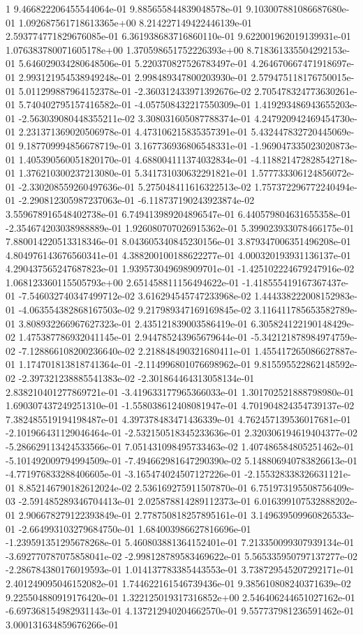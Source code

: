 1	9.466822206455544064e-01	9.885655844839048578e-01	9.103007881086687680e-01	1.092687561718613365e+00	8.214227149422446139e-01	2.593774771829676085e-01	6.361938683716860110e-01	9.622001962019139931e-01	1.076383780071605178e+00	1.370598651752226393e+00	8.718361335504292153e-01	5.646029034280648506e-01	5.220370827526783497e-01	4.264670667471918697e-01	2.993121954538949248e-01	2.998489347800203930e-01	2.579475118176750015e-01	5.011299887964152378e-01	-2.360312433971392676e-02	2.705478324773630261e-01	5.740402795157416582e-01	-4.057508432217550309e-01	1.419293486943655203e-01	-2.563039080448355211e-02	3.308031605087788374e-01	4.247920942469454730e-01	2.231371369020506978e-01	4.473106215835357391e-01	5.432447832720445069e-01	9.187709994856678719e-01	3.167736936806548331e-01	-1.969047335023020873e-01	1.405390560051820170e-01	4.688004111374032834e-01	-4.118821472828542718e-01	1.376210300237213080e-01	5.341731030632291821e-01	1.577733306124856072e-01	-2.330208559260497636e-01	5.275048411616322513e-02	1.757372296772240494e-01	-2.290812305987237063e-01	-6.118737190243923874e-02	3.559678916548402738e-01	6.749413989204896547e-01	6.440579804631655358e-01	-2.354674203038988889e-01	1.926080707026915362e-01	5.399023933078466175e-01	7.880014220513318346e-01	8.043605340845230156e-01	3.879347006351496208e-01	4.804976143676560341e-01	4.388200100188622277e-01	4.000320193931136137e-01	4.290437565247687823e-01	1.939573049698909701e-01	-1.425102224679247916e-02	1.068123360115505793e+00	2.651458811156494622e-01	-1.418555419167367437e-01	-7.546032740347499712e-02	3.616294545747233968e-02	1.444338222008152983e-01	-4.063554382868167503e-02	9.217989347169169845e-02	3.116411785653582789e-01	3.808932266967627323e-01	2.435121839003586419e-01	6.305824122190148429e-02	1.475387786932041145e-01	2.944785243965679644e-01	-5.342121878984974759e-02	-7.128866108200236640e-02	2.218848490321680411e-01	1.455417265086627887e-01	1.174701813818741364e-01	-2.114996801076698962e-01	9.815595522862148592e-02	-2.397321238885541383e-02	-2.301864464313058134e-01	2.838210401277869721e-01	-3.419633177965366033e-01	1.301702521888798980e-01	1.690307437249251310e-01	-1.558038612408081947e-01	4.701904824354739137e-02	7.382485519194198487e-01	4.397378483471436339e-01	4.762457139536017681e-01	-2.101966431129046464e-01	-2.532150518345233636e-01	2.320306194619404377e-02	-5.286629113424533566e-01	7.051431098495733463e-02	1.407486584805251462e-01	-5.101492009794994509e-01	-7.494662981647290390e-02	5.148806940783826613e-01	-4.771976833288406605e-01	-3.165474024507127226e-01	-2.155328338326631121e-01	8.852146790182612024e-02	2.536169275911507870e-01	6.751973195508756409e-03	-2.591485289346704413e-01	2.025878814289112373e-01	6.016399107532888202e-01	2.906678279122393849e-01	2.778750818257895161e-01	3.149639509960826533e-01	-2.664993103279684750e-01	1.684003986627816696e-01	-1.239591351295678268e-01	5.460803881364152401e-01	7.213350099307939134e-01	-3.692770787075858041e-02	-2.998128789583469622e-01	5.565335950797137277e-02	-2.286784380176019593e-01	1.014137783385443553e-01	3.738729545207292171e-01	2.401249095046152082e-01	1.744622161546739436e-01	9.385610808240371639e-02	9.225504880919176420e-01	1.322125019317316852e+00	2.546406244651027162e-01	-6.697368154982931143e-01	4.137212940204662570e-01	9.557737981236591462e-01	3.000131634859676266e-01